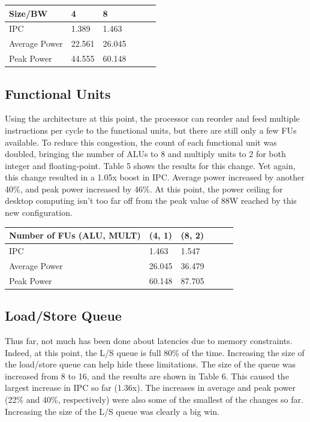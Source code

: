 \documentclass[english]{article}
\begin{document}
\begin{center}
	\vspace{.30cm}
	\begin{tabular}{ | l | l | l | l | l | l |}
		\hline
	 Size/BW & 4 & 8 \\ \hline
     IPC & 1.389 & 1.463 \\ \hline
     Average Power & 22.561 & 26.045 \\ \hline
     Peak Power & 44.555 & 60.148 \\ \hline
	\end{tabular}
\end{center}

\subsection{Functional Units}
Using the architecture at this point, the processor can reorder and feed multiple instructions per cycle to the functional units, but there are still only a few FUs available. To reduce this congestion, the count of each functional unit was doubled, bringing the number of ALUs to 8 and multiply units to 2 for both integer and floating-point. Table 5 shows the results for this change. Yet again, this change resulted in a 1.05x boost in IPC. Average power increased by another 40\%, and peak power increased by 46\%. At this point, the power ceiling for desktop computing isn't too far off from the peak value of 88W reached by this new configuration.

\begin{center}
	\vspace{.30cm}
	\begin{tabular}{ | l | l | l | l | l | l |}
		\hline
	 Number of FUs (ALU, MULT) & (4, 1) & (8, 2) \\ \hline
     IPC & 1.463 & 1.547 \\ \hline
     Average Power & 26.045 & 36.479 \\ \hline
     Peak Power & 60.148 & 87.705 \\ \hline
	\end{tabular}
\end{center}

\subsection{Load/Store Queue}
Thus far, not much has been done about latencies due to memory constraints. Indeed, at this point, the L/S queue is full 80\% of the time. Increasing the size of the load/store queue can help hide these limitations. The size of the queue was increased from 8 to 16, and the results are shown in Table 6. This caused the largest increase in IPC so far (1.36x). The increases in average and peak power (22\% and 40\%, respectively) were also some of the smallest of the changes so far. Increasing the size of the L/S queue was clearly a big win.
\end{document}
